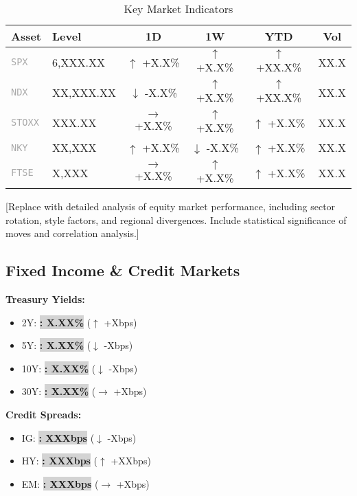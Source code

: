 \documentclass[11pt,a4paper]{article}
\makeatletter
\newcommand{\metric}[2]{\colorbox{lightgray}{\textbf{#1: #2}}}
\newcommand{\ticker}[1]{\texttt{\textcolor{darkgray}{#1}}}
\newcommand{\up}[1]{\textcolor{successgreen}{$\uparrow$ #1}}
\newcommand{\down}[1]{\textcolor{dangerred}{$\downarrow$ #1}}
\newcommand{\flat}[1]{\textcolor{mediumgray}{$\rightarrow$ #1}}
\newenvironment{markettable}[1][Key Market Indicators]{%
    \begin{table}[h]
    \centering
    \caption{#1}
    \footnotesize
    \renewcommand{\arraystretch}{1.3}
    \begin{tabular}{@{}llcccc@{}}
    \toprule
    \rowcolor{jetblack!10}
    \textbf{Asset} & \textbf{Level} & \textbf{1D} & \textbf{1W} & \textbf{YTD} & \textbf{Vol} \\
    \midrule
}{%
    \bottomrule
    \end{tabular}
    \end{table}
}
\newcommand{\starttwocol}{\begin{multicols}{2}}
\newcommand{\endtwocol}{\end{multicols}}
\makeatother
\begin{document}
\begin{markettable}
\ticker{SPX} & 6,XXX.XX & \up{+X.X\%} & \up{+X.X\%} & \up{+XX.X\%} & XX.X \\
\rowcolor{tablealternate}
\ticker{NDX} & XX,XXX.XX & \down{-X.X\%} & \up{+X.X\%} & \up{+XX.X\%} & XX.X \\
\ticker{STOXX} & XXX.XX & \flat{+X.X\%} & \up{+X.X\%} & \up{+X.X\%} & XX.X \\
\rowcolor{tablealternate}
\ticker{NKY} & XX,XXX & \up{+X.X\%} & \down{-X.X\%} & \up{+X.X\%} & XX.X \\
\ticker{FTSE} & X,XXX & \flat{+X.X\%} & \up{+X.X\%} & \up{+X.X\%} & XX.X \\
\end{markettable}

[Replace with detailed analysis of equity market performance, including sector rotation, style factors, and regional divergences. Include statistical significance of moves and correlation analysis.]

\subsection{Fixed Income \& Credit Markets}

\starttwocol
\textbf{Treasury Yields:}
\begin{itemize}[leftmargin=*]
    \item 2Y: \metric{}{X.XX\%} (\up{+Xbps})
    \item 5Y: \metric{}{X.XX\%} (\down{-Xbps})
    \item 10Y: \metric{}{X.XX\%} (\down{-Xbps})
    \item 30Y: \metric{}{X.XX\%} (\flat{+Xbps})
\end{itemize}

\textbf{Credit Spreads:}
\begin{itemize}[leftmargin=*]
    \item IG: \metric{}{XXXbps} (\down{-Xbps})
    \item HY: \metric{}{XXXbps} (\up{+XXbps})
    \item EM: \metric{}{XXXbps} (\flat{+Xbps})
\end{itemize}
\endtwocol
\end{document}
